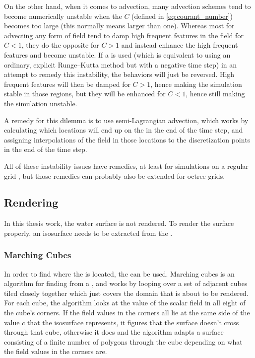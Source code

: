 On the other hand, when it comes to advection, many advection schemes tend to become numerically unstable when the  $C$ (defined in \eqref{eq:courant_number}) becomes too large (this normally means larger than one). Whereas most  for advecting any form of field tend to damp high frequent features in the field for $C < 1$, they do the opposite for $C > 1$ and instead enhance the high frequent features and become unstable. If a  is used (which is equivalent to using an ordinary, explicit Runge--Kutta method but with a negative time step) in an attempt to remedy this instability, the behaviors will just be reversed. High frequent features will then be damped for $C > 1$, hence making the simulation stable in those regions, but they will be enhanced for $C < 1$, hence still making the simulation unstable.

A remedy for this dilemma is to use semi-Lagrangian advection, which works by calculating which locations will end up on the  in the end of the time step, and assigning interpolations of the field in those locations to the discretization points in the end of the time step.

All of these instability issues have remedies, at least for simulations on a regular grid \citep{Stam1999,Kwatra2009,Lentine2012}, but those remedies can probably also be extended for octree grids.

\subsection{Rendering}

In this thesis work, the water surface is not rendered. To render the surface properly, an isosurface needs to be extracted from the .

\subsubsection{Marching Cubes}
\label{sec:marchingcubesdescription}

In order to find where the  is located, the   can be used. Marching cubes is an algorithm for finding \isosurfaces from a , and works by looping over a set of adjacent cubes tiled closely together which just covers the domain that is about to be rendered. For each cube, the algorithm looks at the value of the scalar field in all eight of the cube's corners. If the field values in the corners all lie at the same side of the value $c$ that the isosurface represents, it figures that the surface doesn't cross through that cube, otherwise it does and the algorithm adapts a surface consisting of a finite number of polygons through the cube depending on what the field values in the corners are.


